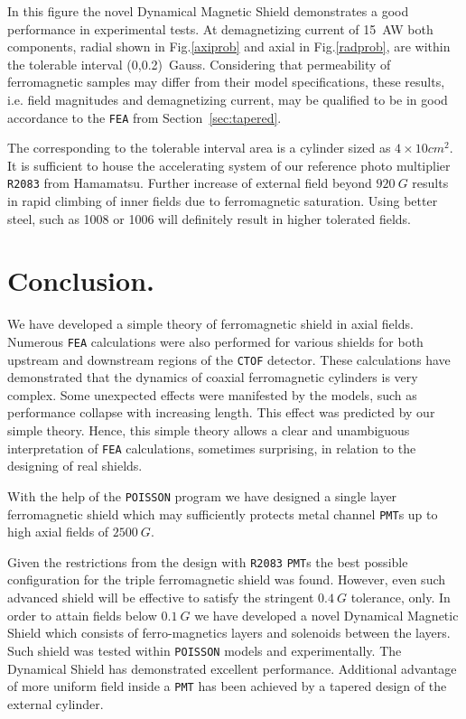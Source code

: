 \documentclass[12pt]{article}
\begin{document}
In this figure  the novel Dynamical Magnetic Shield demonstrates 
 a good performance in experimental tests. At demagnetizing current of 15~AW
both components, radial shown in Fig.\ref{axiprob} and axial in Fig.\ref{radprob}, 
are within the tolerable  interval (0,0.2)~Gauss.
Considering that permeability of ferromagnetic samples may differ from their model specifications, 
 these results, i.e. field magnitudes and demagnetizing current, 
 may be qualified to be in good accordance to the {\tt FEA}  from Section~\ref{sec:tapered}.

The corresponding to the tolerable interval   area is a  cylinder sized as 
$4\times10 cm^2$. It  is sufficient to house the accelerating system of 
our reference  photo multiplier  {\tt R2083} from Hamamatsu.
Further increase of external  field beyond $920~G$ results in rapid climbing  of inner fields 
due to  ferromagnetic saturation.
Using better steel, such as 1008 or 1006 will definitely result in higher tolerated fields.

\section{Conclusion.}
\label{sec:concl}
We have developed a simple theory of ferromagnetic  shield in axial fields.
Numerous {\tt FEA} calculations were also  performed for various shields for both upstream and 
downstream regions of the {\tt CTOF} detector. 
These calculations have demonstrated that the dynamics of coaxial   
ferromagnetic cylinders is very
complex. Some  unexpected effects were manifested by the models, 
such as  performance  
collapse with increasing  length.  
This effect was predicted  by our simple   theory.
Hence, this  simple theory allows a  clear and unambiguous   interpretation of  
{\tt FEA} calculations, sometimes surprising, in relation to the  designing of real shields.

With the  help of the {\tt POISSON} program we have designed a  single layer  ferromagnetic 
shield which  may sufficiently protects  metal channel {\tt PMT}s  up to high axial 
fields of $2500~G$.   
                                                        
Given the restrictions from the  design with {\tt R2083} {\tt PMT}s 
the best possible configuration for the triple ferromagnetic  shield was found. 
However, even such advanced  shield
will  be effective  to satisfy the stringent $0.4~G$ tolerance, only.
In order to  attain fields below $0.1~G$ we have developed a novel 
Dynamical Magnetic Shield which consists  of ferro-magnetics layers 
and solenoids  between the layers. 
Such shield was tested within  {\tt POISSON} models  
and experimentally.  The Dynamical Shield  has demonstrated  excellent  performance.   
Additional advantage of more uniform field inside a {\tt PMT} 
has been achieved by a tapered design of the external cylinder. 
\end{document}
